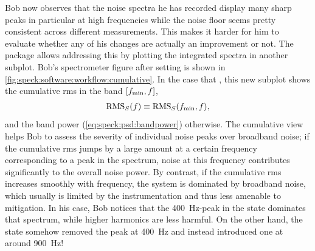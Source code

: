 Bob now observes that the noise spectra he has recorded display many sharp peaks in particular at high frequencies while the \oneoverf noise floor seems pretty consistent across different measurements.
This makes it harder for him to evaluate whether any of his changes are actually an improvement or not.
The \pyspeck package allows addressing this by plotting the integrated spectra in another subplot.
Bob's spectrometer figure after setting  is shown in \cref{fig:speck:software:workflow:cumulative}.
In the case that , this new subplot shows the cumulative \gls{rms} in the band $[f_{\mathrm{min}}, f]$,
\begin{align}\label{eq:speck:software:cumulative}
    \operatorname{RMS}_S(f)\equiv\operatorname{RMS}_S(f_{\mathrm{min}}, f),
\end{align}
and the band power (\cref{eq:speck:psd:bandpower}) otherwise.
The cumulative view helps Bob to assess the severity of individual noise peaks over broadband noise; if the cumulative \gls{rms} jumps by a large amount at a certain frequency corresponding to a peak in the spectrum, noise at this frequency contributes significantly to the overall noise power.
By contrast, if the cumulative \gls{rms} increases smoothly with frequency, the system is dominated by broadband noise, which usually is limited by the instrumentation and thus less amenable to mitigation.
In his case, Bob notices that the \qty{400}{\hertz}-peak in the  state dominates that spectrum, while higher harmonics are less harmful.
On the other hand, the  state somehow removed the peak at \qty{400}{\hertz} and instead introduced one at around \qty{900}{\hertz}!

